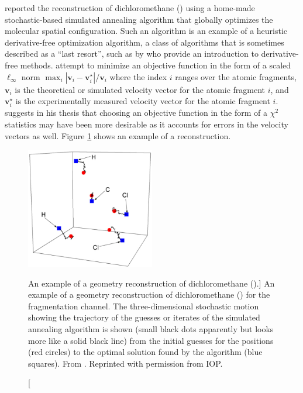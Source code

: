 \citet{Gagnon08} reported the reconstruction of dichloromethane () using a home-made\footnotemark~ stochastic-based simulated annealing algorithm that globally optimizes the molecular spatial configuration. Such an algorithm is an example of a heuristic derivative-free optimization algorithm, a class of algorithms that is sometimes described as a ``last resort'', such as by \cite{Conn09} who provide an introduction to derivative-free methods. \citet{Gagnon08} attempt to minimize an objective function in the form of a scaled $\ell_\infty$ norm $\max_i |\mathbf{v}_i - \mathbf{v}_i^\star|/\mathbf{v}_i$ where the index $i$ ranges over the atomic fragments, $\mathbf{v}_i$ is the theoretical or simulated velocity vector for the atomic fragment $i$, and $\mathbf{v}_i^\star$ is the experimentally measured velocity vector for the atomic fragment $i$. \citet[p. 49]{Gagnon06} suggests in his thesis that choosing an objective function in the form of a $\chi^2$ statistics may have been more desirable as it accounts for errors in the velocity vectors as well. Figure \ref{fig:CH2Cl2geometry} shows an example of a reconstruction.


\begin{figure}
  \centering
  \includegraphics[width=0.5\textwidth]{gfx/CH2Cl2Geometry}
  \caption
  [An example of a geometry reconstruction of dichloromethane ().]
  {An example of a geometry reconstruction of dichloromethane () for the  fragmentation channel. The three-dimensional stochastic motion showing the trajectory of the guesses or iterates of the simulated annealing algorithm is shown (small black dots apparently but looks more like a solid black line) from the initial guesses for the positions (red circles) to the optimal solution found by the algorithm (blue squares). From \citet{Gagnon08}. Reprinted with permission from IOP.}
  \label{fig:CH2Cl2geometry}
\end{figure}

